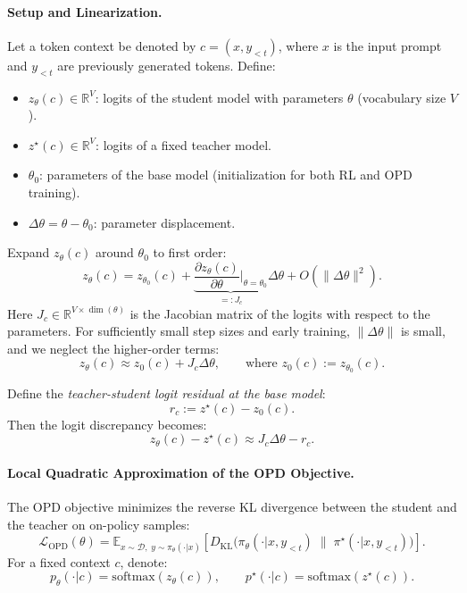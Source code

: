 \documentclass{article}
\begin{document}
\paragraph{Setup and Linearization.}
Let a token context be denoted by \(c = (x, y_{<t})\), where \(x\) is the input prompt and \(y_{<t}\) are previously generated tokens.  
Define:
\begin{itemize}
    \item \(z_{\theta}(c) \in \mathbb{R}^{V}\): logits of the student model with parameters \(\theta\) (vocabulary size \(V\)).
    \item \(z^{\star}(c) \in \mathbb{R}^{V}\): logits of a fixed teacher model.
    \item \(\theta_0\): parameters of the base model (initialization for both RL and OPD training).
    \item \(\Delta\theta = \theta - \theta_0\): parameter displacement.
\end{itemize}

Expand \(z_{\theta}(c)\) around \(\theta_0\) to first order:
\begin{equation}
z_{\theta}(c) = z_{\theta_0}(c) + \underbrace{\frac{\partial z_{\theta}(c)}{\partial \theta}\bigg|_{\theta=\theta_0}}_{=: J_c} \Delta\theta + O(\|\Delta\theta\|^2).
\end{equation}
Here \(J_c \in \mathbb{R}^{V \times \dim(\theta)}\) is the Jacobian matrix of the logits with respect to the parameters.  
For sufficiently small step sizes and early training, \(\|\Delta\theta\|\) is small, and we neglect the higher-order terms:
\begin{equation}
z_{\theta}(c) \approx z_{0}(c) + J_c \Delta\theta, \qquad \text{where } z_{0}(c):=z_{\theta_0}(c).
\end{equation}

Define the \emph{teacher-student logit residual at the base model}:
\begin{equation}
r_c := z^{\star}(c) - z_{0}(c).
\end{equation}
Then the logit discrepancy becomes:
\begin{equation}
z_{\theta}(c) - z^{\star}(c) \approx J_c \Delta\theta - r_c.
\end{equation}

\paragraph{Local Quadratic Approximation of the OPD Objective.}
The OPD objective minimizes the reverse KL divergence between the student and the teacher on on-policy samples:
\begin{equation}
\mathcal{L}_{\mathrm{OPD}}(\theta) = \mathbb{E}_{x\sim\mathcal{D},\; y\sim\pi_{\theta}(\cdot|x)}\left[ D_{\mathrm{KL}}\big(\pi_{\theta}(\cdot|x,y_{<t})\;\|\; \pi^{\star}(\cdot|x,y_{<t})\big) \right].
\end{equation}
For a fixed context \(c\), denote:
\begin{equation}
p_{\theta}(\cdot|c) = \mathrm{softmax}(z_{\theta}(c)), \qquad p^{\star}(\cdot|c) = \mathrm{softmax}(z^{\star}(c)).
\end{equation}
\end{document}
